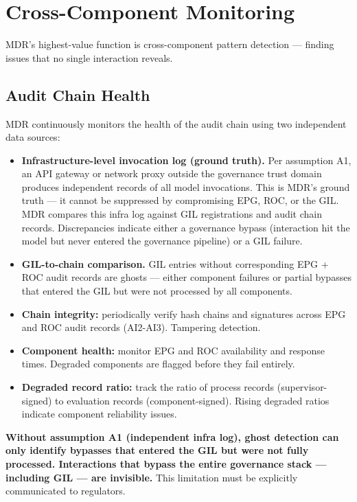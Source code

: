 \section{Cross-Component Monitoring}
\label{sec:monitoring-3}


MDR's highest-value function is cross-component pattern detection --- finding issues that no single interaction reveals.

\subsection{Audit Chain Health}


MDR continuously monitors the health of the audit chain using two independent data sources:

\begin{itemize}
  \item \textbf{Infrastructure-level invocation log (ground truth).} Per assumption A1, an API gateway or network proxy outside the governance trust domain produces independent records of all model invocations. This is MDR's ground truth --- it cannot be suppressed by compromising EPG, ROC, or the GIL. MDR compares this infra log against GIL registrations and audit chain records. Discrepancies indicate either a governance bypass (interaction hit the model but never entered the governance pipeline) or a GIL failure.
  \item \textbf{GIL-to-chain comparison.} GIL entries without corresponding EPG + ROC audit records are ghosts --- either component failures or partial bypasses that entered the GIL but were not processed by all components.
  \item \textbf{Chain integrity:} periodically verify hash chains and signatures across EPG and ROC audit records (AI2-AI3). Tampering detection.
  \item \textbf{Component health:} monitor EPG and ROC availability and response times. Degraded components are flagged before they fail entirely.
  \item \textbf{Degraded record ratio:} track the ratio of process records (supervisor-signed) to evaluation records (component-signed). Rising degraded ratios indicate component reliability issues.
\end{itemize}


\textbf{Without assumption A1 (independent infra log), ghost detection can only identify bypasses that entered the GIL but were not fully processed. Interactions that bypass the entire governance stack --- including GIL --- are invisible.} This limitation must be explicitly communicated to regulators.

